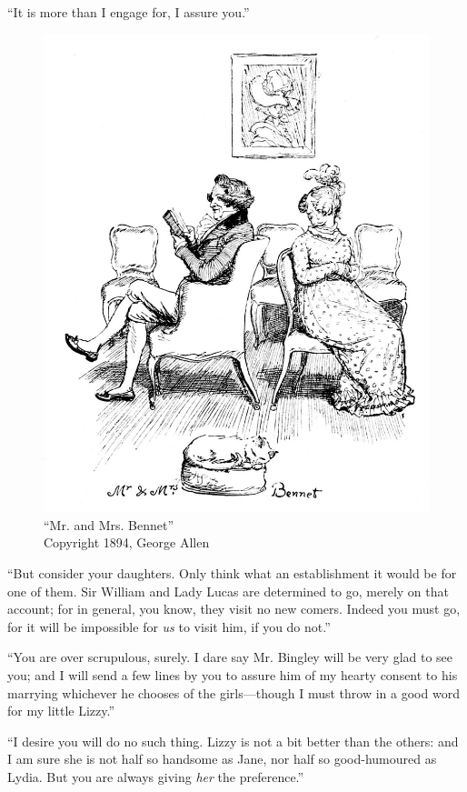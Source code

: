 ``It is more than I engage for, I assure you.''
\begin{figure}[htbp]
    \centering
    \includegraphics[width=\textwidth]{illustrations/i_034.jpg}
    \caption{“Mr. and Mrs. Bennet”\\ Copyright 1894, George Allen}
    \label{fig:image1}
\end{figure}

``But consider your daughters. Only think what an establishment it would be for one of them. Sir William and Lady Lucas are determined to go, merely on that account; for in general, you know, they visit no new comers. Indeed you must go, for it will be impossible for \textit{us} to visit him, if you do not.''

``You are over scrupulous, surely. I dare say Mr. Bingley will be very glad to see you; and I will send a few lines by you to assure him of my hearty consent to his marrying whichever he chooses of the girls---though I must throw in a good word for my little Lizzy.''

``I desire you will do no such thing. Lizzy is not a bit better than the others: and I am sure she is not half so handsome as Jane, nor half so good-humoured as Lydia. But you are always giving \textit{her} the preference.''


